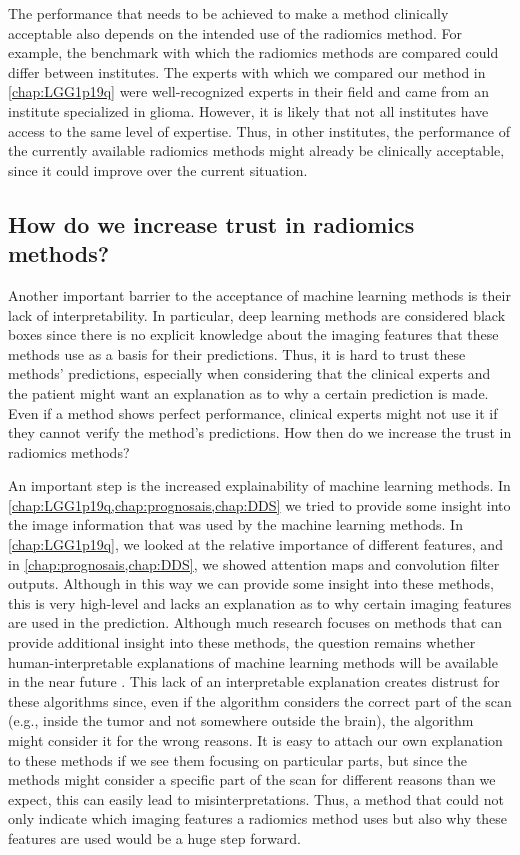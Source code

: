 The performance that needs to be achieved to make a method clinically acceptable also depends on the intended use of the radiomics method.
For example, the benchmark with which the radiomics methods are compared could differ between institutes.
The experts with which we compared our method in \cref{chap:LGG1p19q} were well-recognized experts in their field and came from an institute specialized in glioma.
However, it is likely that not all institutes have access to the same level of expertise.
Thus, in other institutes, the performance of the currently available radiomics methods might already be clinically acceptable, since it could improve over the current situation.

\subsection{How do we increase trust in radiomics methods?}

Another important barrier to the acceptance of machine learning methods is their lack of interpretability.
In particular, deep learning methods are considered black boxes since there is no explicit knowledge about the imaging features that these methods use as a basis for their predictions.
Thus, it is hard to trust these methods' predictions, especially when considering that the clinical experts and the patient might want an explanation as to why a certain prediction is made.
Even if a method shows perfect performance, clinical experts might not use it if they cannot verify the method's predictions.
How then do we increase the trust in radiomics methods?

An important step is the increased explainability of machine learning methods.
In \cref{chap:LGG1p19q,chap:prognosais,chap:DDS} we  tried to provide some insight into the image information that was used by the machine learning methods.
In \cref{chap:LGG1p19q}, we looked at the relative importance of different features, and in \cref{chap:prognosais,chap:DDS}, we showed attention maps and convolution filter outputs.
Although in this way we can provide some insight into these methods, this is very high-level and lacks an explanation as to why certain imaging features are used in the prediction.
Although much research focuses on methods that can provide additional insight into these methods, the question remains whether human-interpretable explanations of machine learning methods will be available in the near future \autocite{zhang2018interpretable}.
This lack of an interpretable explanation creates distrust for these algorithms since, even if the algorithm considers the correct part of the scan (e.g., inside the \gls{tumor} and not somewhere outside the brain), the algorithm might consider it for the wrong reasons.
It is easy to attach our own explanation to these methods if we see them focusing on particular parts, but since the methods might consider a specific part of the scan for different reasons than we expect, this can easily lead to misinterpretations.
Thus, a method that could not only indicate which imaging features a radiomics method uses but also why these features are used would be a huge step forward.

